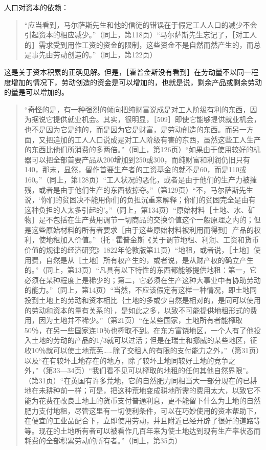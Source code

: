 人口对资本的依赖：

\begin{quote}{“应当看到，马尔萨斯先生和他的信徒的错误在于假定工人人口的减少不会引起资本的相应减少。”（同上，第118页）“马尔萨斯先生忘记了，［对工人的］需求受到用作工资的资金的限制，这些资金不是自然而然产生的，而总是事先由劳动创造的。”（同上，第122页）}\end{quote}

\todo{}

这是关于资本积累的正确见解。但是，［霍普金斯没有看到］在劳动量不以同一程度增加的情况下，劳动创造的资金是可以增加的，也就是说，剩余产品或剩余劳动的量是可以增加的。

\begin{quote}{“奇怪的是，有一种强烈的倾向把纯财富说成是对工人阶级有利的东西，因为据说它提供就业机会。其实，很明显，［509］即使它能够提供就业机会，也不是因为它是纯的，而是因为它是财富，是劳动创造的东西。而另一方面，又把追加的工人人口说成是对工人阶级有害的东西，虽然这些工人生产的东西比他们所消费的多两倍。”（同上，第126页）“如果由于使用较好的机器可以把全部首要产品从200增加到250或300，而纯财富和利润仍旧只有140，那末，显然，留作首要生产者的工资基金的就不是60，而是110或160。”（同上，第128页）“工人状况的恶化，或者是由于他们的生产力被摧残，或者是由于他们生产的东西被掠夺。”（第129页）“不，马尔萨斯先生说，‘你们的贫困决不能用你们的负担沉重来解释；你们的贫困完全是由有这种负担的人太多引起的’。”（同上，第134页）“原始材料［土地、水、矿物］是不包括在生产费用调节一切商品的交换价值这个一般原理之内的；但是这些原始材料的所有者要求［由于这些原始材料被利用而得到］产品的权利，使地租加入价值。”（托·霍普金斯《关于调节地租、利润、工资和货币价值的规律的经济研究》1822年伦敦版第11页）“地租，或者说，［土地］使用费，自然是从［土地］所有权产生的，或者说，是从财产权的确立产生的。”（同上，第13页）“凡具有以下特性的东西都能够提供地租：第一，它必须在某种程度上是稀少的；第二，它必须在生产这种大事业中有协助劳动的能力。”（同上，第14页）“当然，不应该假定有这样一种情况，即土地同投到土地上的劳动和资本相比｛土地的多或少自然是相对的，是同可以使用的劳动和资本的量有关系的｝，是如此之多，以致不可能提供地租形式的费用，因为土地并不稀少。”（第21页）“在某些国家，土地所有者能榨取50％，在另一些国家连10％也榨取不到。在东方富饶地区，一个人有了他投入土地的劳动的产品的1/3就可以过活；但是在瑞士和挪威的某些地区，征收10％就可以使土地荒芜……除了交租人的有限的支付能力之外，”（第31页）以及“在有较坏土地存在的地方，除了较坏土地同较好土地的竞争之外，”（第33—34页）“我们看不见可以榨取的地租的任何其他自然界限”。（第31页）“在英国有许多荒地，它的自然肥力同相当大一部分现在的已耕地在未耕种前一样；可是，把这种荒地变成耕地所需的费用太大，以致它不能为花费在改良土地上的货币支付普通利息，更不能留下什么为土地的自然肥力支付地租，尽管这里有一切便利条件，可以在巧妙使用的资本帮助下，在便宜的工业品配合下，立即使用劳动，并且附近已经开辟了很好的道路等等。现在的土地所有者可以被看作几百年来为使土地达到现有生产率状态而耗费的全部积累劳动的所有者。”（同上，第35页）}\end{quote}

